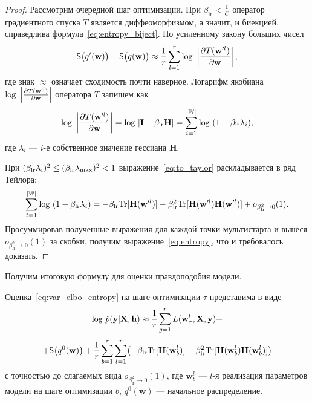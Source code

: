 \begin{proof}




Рассмотрим очередной шаг оптимизации. При $\beta_{\text{lr}}<\frac{1}{C}$ оператор градиентного спуска $T$ является диффеоморфизмом, а значит, и биекцией, справедлива формула~\eqref{eq:entropy_biject}.
По усиленному закону больших чисел 
\[
	\mathsf{S}\bigl(q'(\mathbf{w})\bigr) -  \mathsf{S}\bigl(q(\mathbf{w})\bigr)  \approx  \frac{1}{r}\sum_{l=1}^r \textnormal{log}~\left|\frac{\partial{T(\mathbf{w}'^l)}}{\partial{\mathbf{w}}}\right|,
\]
где знак $\approx$ означает сходимость почти наверное.
Логарифм якобиана  $\textnormal{log}~\left|\frac{\partial{T(\mathbf{w}'^l)}}{\partial{\mathbf{w}}}\right|$ оператора $T$ запишем как%
\begin{equation}
\label{eq:to_taylor}
	\textnormal{log}~\left|\frac{\partial{T(\mathbf{w}'^l)}}{\partial{\mathbf{w}}}\right| = \textnormal{log}~|\mathbf{I} - \beta_{\text{lr}}\mathbf{H}| = \sum_{i=1}^{|\mathbb{W}|} \textnormal{log}~(1-\beta_{\text{lr}}\lambda_i),
\end{equation}
где $\lambda_i$ --- $i$-е собственное значение гессиана $\mathbf{H}$.

При $(\beta_{\text{lr}}\lambda_i) ^ 2 \leq (\beta_{\text{lr}}\lambda_\textnormal{max})^2 < 1$ выражение~\eqref{eq:to_taylor} раскладывается в ряд Тейлора:
\[
	 \sum_{t=1}^{|\mathbb{W}|} \textnormal{log}~(1-\beta_{\text{lr}}\lambda_i) =  -\beta_{\text{lr}} \textnormal{Tr}[\mathbf{H}(\mathbf{w}'^l)] - \beta_{\text{lr}}^2 \textnormal{Tr}[\mathbf{H}(\mathbf{w}'^l)\mathbf{H}(\mathbf{w}'^l)] + o_{\beta_{\text{lr}}^2 \to 0}(1).
\]
Просуммировав полученные выражения для каждой точки мультистарта и вынеся $o_{\beta_{\text{lr}}^2 \to 0}(1)$ за скобки, получим выражение~\eqref{eq:entropy}, что и требовалось доказать.

\end{proof} 	


Получим итоговую формулу для оценки правдоподобия модели.
\begin{theorem}\label{st:st2}
Оценка~\eqref{eq:var_elbo_entropy} на шаге оптимизации $\tau$ представима в виде
\begin{equation}
\label{eq:ev_grad_full}
\textnormal{log}~\hat{p}(\mathbf{y}|\mathbf{X}, \mathbf{h}) \approx \frac{1}{r} \sum_{g = 1}^r L(\mathbf{w}^l_\tau, \mathbf{X}, \mathbf{y})  + 
\end{equation}
\[
+\mathsf{S}\big(q^0(\mathbf{w})\bigr) + \frac{1}{r}\sum_{b=1}^\tau\sum_{l=1}^r \bigl(-\beta_{\text{lr}} \textnormal{Tr}[\mathbf{H}(\mathbf{w}_b^l)] - \beta_{\text{lr}}^2 \textnormal{Tr}[\mathbf{H}(\mathbf{w}_b^l)\mathbf{H}(\mathbf{w}_b^l)]  \bigr) 
\]
с точностью до слагаемых вида $o_{\beta_{\text{lr}}^2 \to 0}(1)$,
где $\mathbf{w}_b^l$ --- $l$-я реализация параметров модели на шаге оптимизации $b$, $q^0(\mathbf{w})$ --- начальное распределение.
\end{theorem}



